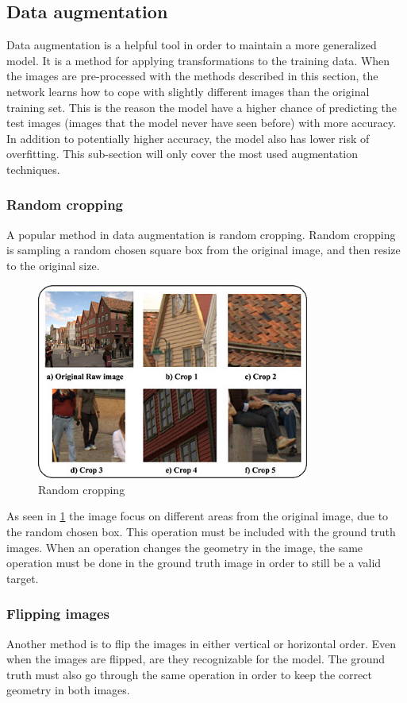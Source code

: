 \documentclass[USenglish]{ifimaster}  %
\begin{document}
\subsection{Data augmentation}
Data augmentation is a helpful tool in order to maintain a more generalized model. It is a method for applying transformations to the training data. When the images are pre-processed with the methods described in this section, the network learns how to cope with slightly different images than the original training set. This is the reason the model have a higher chance of predicting the test images (images that the model never have seen before) with more accuracy. In addition to potentially higher accuracy, the model also has lower risk of overfitting. This sub-section will only cover the most used augmentation techniques.  
\subsubsection{Random cropping}
A popular method in data augmentation is random cropping. Random cropping is sampling a random chosen square box from the original image, and then resize to the original size.
\begin{figure}[H]
    \centering
    \includegraphics[width=0.8\textwidth]{bilder/random_cropping.png}
    \caption{Random cropping \cite{website:random_cropping}}
    \label{fig:random_cropping}
\end{figure}
As seen in \cref{fig:random_cropping} the image focus on different areas from the original image, due to the random chosen box. This operation must be included with the ground truth images. When an operation changes the geometry in the image, the same operation must be done in the ground truth image in order to still be a valid target. 
\subsubsection{Flipping images}
Another method is to flip the images in either vertical or horizontal order. Even when the images are flipped, are they recognizable for the model. The ground truth must also go through the same operation in order to keep the correct geometry in both images. 
\end{document}
